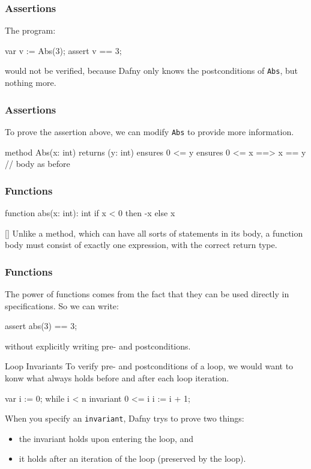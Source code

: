 \documentclass[10pt, compress]{beamer}
\begin{document}
\begin{frame}[fragile]
  \frametitle{Assertions}

  The program:
  \begin{verbnobox}[\footnotesize]
var v := Abs(3);
assert v == 3;
  \end{verbnobox}
  would not be verified, because Dafny only knows the postconditions of \verb|Abs|, but nothing more.
\end{frame}

\begin{frame}[fragile]
  \frametitle{Assertions}
  To prove the assertion above, we can modify \verb|Abs| to provide more information.
  \begin{verbnobox}[\footnotesize]
method Abs(x: int) returns (y: int)
   ensures 0 <= y
   ensures 0 <= x ==> x == y
{
   // body as before
}
  \end{verbnobox}
\end{frame}

\begin{frame}[fragile]
  \frametitle{Functions}
  \begin{verbnobox}[\footnotesize]
function abs(x: int): int
{
   if x < 0 then -x else x
}
  \end{verbnobox}[\footnotesize]
  Unlike a method, which can have all sorts of statements in its body, a function body must consist of exactly one expression, with the correct return type.
\end{frame}

\begin{frame}[fragile]
  \frametitle{Functions}
The power of functions comes from the fact that they can be used directly in specifications. So we can write:
  \begin{verbnobox}[\footnotesize]
assert abs(3) == 3;
  \end{verbnobox}
without explicitly writing pre- and postconditions.

\end{frame}

\begin{frame}[fragile]{Loop Invariants}
To verify pre- and postconditions of a loop, we would want to konw what always holds before and after each loop iteration.
  \begin{verbnobox}[\footnotesize]
var i := 0;
while i < n
   invariant 0 <= i
{
   i := i + 1;
}
  \end{verbnobox}
When you specify an \verb|invariant|, Dafny trys to prove two things:
  \begin{itemize}
  \item the invariant holds upon entering the loop, and
  \item it holds after an iteration of the loop (preserved by the loop).
  \end{itemize}
\end{frame}
\end{document}
